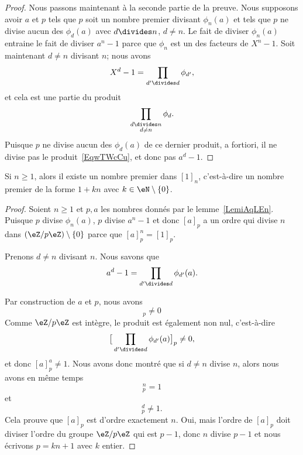 \begin{proof}
	Nous passons maintenant à la seconde partie de la preuve. Nous supposons avoir \( a\) et \( p\) tels que \( p\) soit un nombre premier divisant \( \phi_n(a)\) et tels que \( p\) ne divise aucun des \( \phi_d(a)\) avec \( d\divides n\), \( d\neq n\). Le fait de diviser \( \phi_n(a)\) entraine le fait de diviser \( a^n-1\) parce que \( \phi_n\) est un des facteurs de \( X^n-1\). Soit maintenant \( d\neq n\) divisant \( n\); nous avons
	\begin{equation}    \label{EqwTWcCu}
		X^d-1=\prod_{d'\divides d}\phi_{d'},
	\end{equation}
	et cela est une partie du produit
	\begin{equation}
		\prod_{\substack{d\divides n\\d\neq n}}\phi_d.
	\end{equation}
	Puisque \( p\) ne divise aucun des \( \phi_d(a)\) de ce dernier produit, a fortiori, il ne divise pas le produit~\ref{EqwTWcCu}, et donc pas \( a^d-1\).
\end{proof}

\begin{lemma}       \label{LemrZnmpG}
	Si \( n\geq 1\), alors il existe un nombre premier dans \( [1]_n\), c'est-à-dire un nombre premier de la forme \( 1+kn\) avec \( k\in \eN\setminus\{ 0 \}\).
\end{lemma}

\begin{proof}
	Soient \( n\geq 1\) et \( p,a\) les nombres donnés par le lemme~\ref{LemiAqLEn}. Puisque \( p\) divise \( \phi_n(a)\), \( p\) divise \( a^n-1\) et donc \( [a]_p\) a un ordre qui divise \( n\) dans \( (\eZ/p\eZ)\setminus\{ 0 \}\) parce que \( [a]_p^n=[1]_p\).

	Prenons \( d\neq n\) divisant \( n\). Nous savons que
	\begin{equation}
		a^d-1=\prod_{d'\divides d}\phi_{d'}(a).
	\end{equation}

	Par construction de \( a\) et \( p\), nous avons
	\begin{equation}
		[\phi_{d'}(a)]_p\neq 0
	\end{equation}
	Comme \( \eZ/p\eZ\) est intègre, le produit est également non nul, c'est-à-dire
	\begin{equation}
		\big[ \prod_{d'\divides d}\phi_{d'}(a) \big]_p\neq 0,
	\end{equation}
	et donc \( [a]_p^a\neq 1\). Nous avons donc montré que si \( d\neq n\) divise \( n\), alors nous avons en même temps
	\begin{equation}
		[a]_p^n=1
	\end{equation}
	et
	\begin{equation}
		[a]_p^d\neq 1.
	\end{equation}
	Cela prouve que \( [a]_p\) est d'ordre exactement \( n\). Oui, mais l'ordre de \( [a]_p\) doit diviser l'ordre du groupe \( \eZ/p\eZ\) qui est \( p-1\), donc \( n\) divise \( p-1\) et nous écrivons \( p=kn+1\) avec \( k\) entier.
\end{proof}

